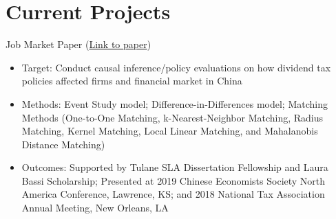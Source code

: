 \documentclass{resume}
\begin{document}
\section{Current Projects}
Job Market Paper (\href{https://liberalarts.tulane.edu/sites/liberalarts.tulane.edu/files/sites/default/files/Xie%20JMP_0.pdf}{Link to paper})
\begin{itemize}
  \item Target: Conduct causal inference/policy evaluations on how dividend tax policies affected firms and financial market in China 
  \item Methods: Event Study model; Difference-in-Differences model; Matching Methods (One-to-One Matching, k-Nearest-Neighbor Matching, Radius Matching, Kernel Matching, Local Linear Matching, and Mahalanobis Distance Matching)
  \item Outcomes: Supported by Tulane SLA Dissertation Fellowship and Laura Bassi Scholarship; Presented at 2019 Chinese Economists Society North America Conference, Lawrence, KS; and 2018 National Tax Association Annual Meeting, New Orleans, LA
\end{itemize}
\end{document}
